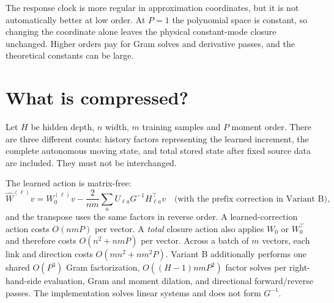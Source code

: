 \documentclass[11pt]{article}
\theoremstyle{definition}
\theoremstyle{remark}
\begin{document}
The response clock is more regular in approximation coordinates, but it is not
automatically better at low order.  At $P=1$ the polynomial space is constant,
so changing the coordinate alone leaves the physical constant-mode closure
unchanged.  Higher orders pay for Gram solves and derivative passes, and the
theoretical constants can be large.

\section{What is compressed?}

Let $H$ be hidden depth, $n$ width, $m$ training samples and $P$ moment order.
There are three different counts: history factors representing the learned
increment, the complete autonomous moving state, and total stored state after
fixed source data are included.  They must not be interchanged.

\begin{table}[t]
\centering
\caption{Exact scalar state counts.  The Variant-B theory minimum packs the
symmetric Gram; the implementation stores all $P^2$ Gram entries.  Fixed
prefix data are shown in factorized form rather than as $n\times n$ outer
products.}
\label{tab:complexity}
\small
{}
\end{table}

The learned action is matrix-free:
\[
 \widehat W^{(\ell)}v=W_0^{(\ell)}v-
 \frac{2}{nm}\sum_a U_{\ell a}G^{-1}H_{\ell a}^\top v
 \quad\text{(with the prefix correction in Variant B)},
\]
and the transpose uses the same factors in reverse order.  A learned-correction
action costs $O(nmP)$ per vector.  A \emph{total} closure action also applies
$W_0$ or $W_0^\top$ and therefore costs $O(n^2+nmP)$ per vector.  Across a
batch of $m$ vectors, each link and direction costs
$O(mn^2+nm^2P)$.  Variant B additionally performs one shared
$O(P^3)$ Gram factorization, $O((H-1)nmP^2)$ factor solves per right-hand-side
evaluation, Gram and moment dilation, and directional forward/reverse passes.
The implementation solves linear systems and does not form $G^{-1}$.
\end{document}
